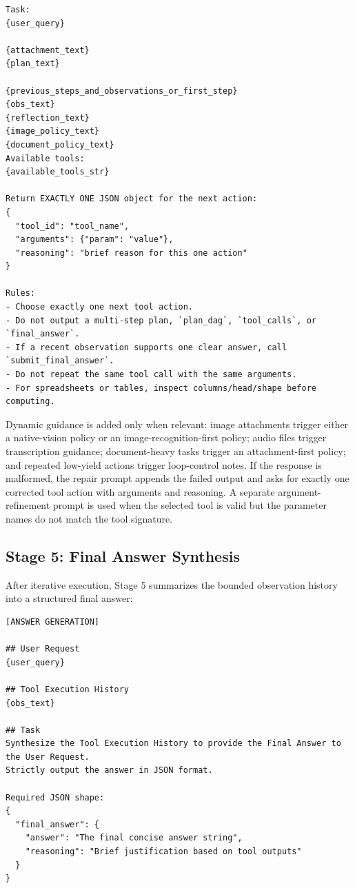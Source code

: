 \documentclass{article}
\begin{document}
\begin{lstlisting}
Task:
{user_query}

{attachment_text}
{plan_text}

{previous_steps_and_observations_or_first_step}
{obs_text}
{reflection_text}
{image_policy_text}
{document_policy_text}
Available tools:
{available_tools_str}

Return EXACTLY ONE JSON object for the next action:
{
  "tool_id": "tool_name",
  "arguments": {"param": "value"},
  "reasoning": "brief reason for this one action"
}

Rules:
- Choose exactly one next tool action.
- Do not output a multi-step plan, `plan_dag`, `tool_calls`, or `final_answer`.
- If a recent observation supports one clear answer, call `submit_final_answer`.
- Do not repeat the same tool call with the same arguments.
- For spreadsheets or tables, inspect columns/head/shape before computing.
\end{lstlisting}

Dynamic guidance is added only when relevant: image attachments trigger either a
native-vision policy or an image-recognition-first policy; audio files trigger
transcription guidance; document-heavy tasks trigger an attachment-first policy;
and repeated low-yield actions trigger loop-control notes. If the response is
malformed, the repair prompt appends the failed output and asks for exactly one
corrected tool action with arguments and reasoning. A separate
argument-refinement prompt is used when the selected tool is valid but the
parameter names do not match the tool signature.

\subsection{Stage 5: Final Answer Synthesis}
\label{subsec:appendix-stage5}

After iterative execution, Stage 5 summarizes the bounded observation history
into a structured final answer:

\begin{lstlisting}
[ANSWER GENERATION]

## User Request
{user_query}

## Tool Execution History
{obs_text}

## Task
Synthesize the Tool Execution History to provide the Final Answer to the User Request.
Strictly output the answer in JSON format.

Required JSON shape:
{
  "final_answer": {
    "answer": "The final concise answer string",
    "reasoning": "Brief justification based on tool outputs"
  }
}
\end{lstlisting}
\end{document}
